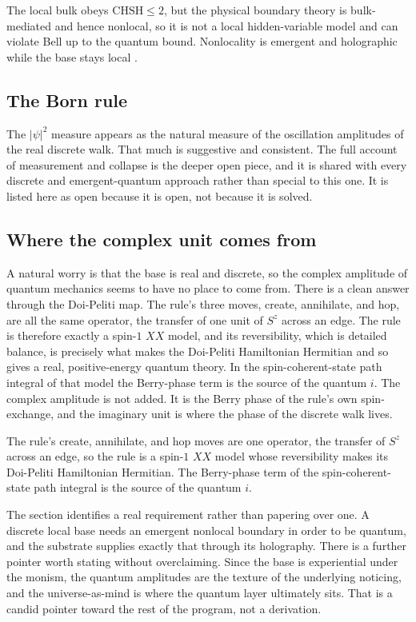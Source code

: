 \begin{proposition}
The local bulk obeys $\mathrm{CHSH} \le 2$, but the physical boundary theory is bulk-mediated and hence nonlocal, so it is not a local hidden-variable model and can violate Bell up to the quantum bound. Nonlocality is emergent and holographic while the base stays local \cite{maldacena1998, ryu2006, swingle2012}.
\end{proposition}

\subsection{The Born rule}

The $|\psi|^2$ measure appears as the natural measure of the oscillation amplitudes of the real discrete walk. That much is suggestive and consistent. The full account of measurement and collapse is the deeper open piece, and it is shared with every discrete and emergent-quantum approach rather than special to this one. It is listed here as open because it is open, not because it is solved.

\subsection{Where the complex unit comes from}

A natural worry is that the base is real and discrete, so the complex amplitude of quantum mechanics seems to have no place to come from. There is a clean answer through the Doi-Peliti map. The rule's three moves, create, annihilate, and hop, are all the same operator, the transfer of one unit of $S^z$ across an edge. The rule is therefore exactly a spin-$1$ $XX$ model, and its reversibility, which is detailed balance, is precisely what makes the Doi-Peliti Hamiltonian Hermitian and so gives a real, positive-energy quantum theory. In the spin-coherent-state path integral of that model the Berry-phase term is the source of the quantum $i$. The complex amplitude is not added. It is the Berry phase of the rule's own spin-exchange, and the imaginary unit is where the phase of the discrete walk lives.

\begin{proposition}
The rule's create, annihilate, and hop moves are one operator, the transfer of $S^z$ across an edge, so the rule is a spin-$1$ $XX$ model whose reversibility makes its Doi-Peliti Hamiltonian Hermitian. The Berry-phase term of the spin-coherent-state path integral is the source of the quantum $i$.
\end{proposition}


The section identifies a real requirement rather than papering over one. A discrete local base needs an emergent nonlocal boundary in order to be quantum, and the substrate supplies exactly that through its holography. There is a further pointer worth stating without overclaiming. Since the base is experiential under the monism, the quantum amplitudes are the texture of the underlying noticing, and the universe-as-mind is where the quantum layer ultimately sits. That is a candid pointer toward the rest of the program, not a derivation.
